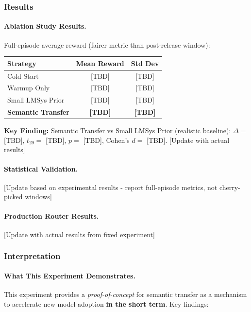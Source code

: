 \subsubsection{Results}

\paragraph{Ablation Study Results.} 
Full-episode average reward (fairer metric than post-release window):

\begin{center}
\begin{tabular}{lcc}
\toprule
Strategy & Mean Reward & Std Dev \\
\midrule
Cold Start & [TBD] & [TBD] \\
Warmup Only & [TBD] & [TBD] \\
Small LMSys Prior & [TBD] & [TBD] \\
\textbf{Semantic Transfer} & \textbf{[TBD]} & \textbf{[TBD]} \\
\bottomrule
\end{tabular}
\end{center}

\noindent\textbf{Key Finding:} Semantic Transfer vs Small LMSys Prior (realistic baseline): $\Delta = $ [TBD], $t_{29} = $ [TBD], $p = $ [TBD], Cohen's $d = $ [TBD]. [Update with actual results]

\paragraph{Statistical Validation.}
[Update based on experimental results - report full-episode metrics, not cherry-picked windows]

\paragraph{Production Router Results.}
[Update with actual results from fixed experiment]

\subsubsection{Interpretation}

\paragraph{What This Experiment Demonstrates.}
This experiment provides a \textit{proof-of-concept} for semantic transfer as a mechanism to accelerate new model adoption \textbf{in the short term}. Key findings:

